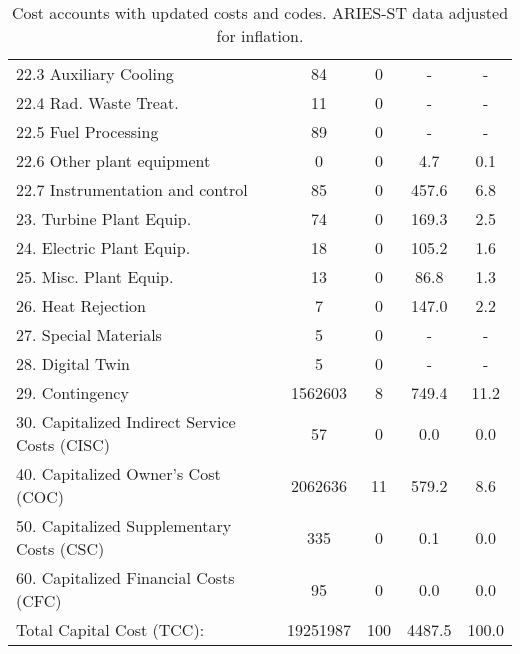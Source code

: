 \begin{table}[h!]
{\begin{tabular}{lcccc}
\hspace{10mm}22.3 Auxiliary Cooling & 84 & 0 & - & - \\
\hspace{10mm}22.4 Rad. Waste Treat. & 11 & 0 & - & - \\
\hspace{10mm}22.5 Fuel Processing & 89 & 0 & - & - \\
\hspace{10mm}22.6 Other plant equipment & 0 & 0 & 4.7 & 0.1 \\
\hspace{10mm}22.7 Instrumentation and control & 85 & 0 & 457.6 & 6.8 \\
\hspace{5mm}23. Turbine Plant Equip. & 74 & 0 & 169.3 & 2.5 \\
\hspace{5mm}24. Electric Plant Equip. & 18 & 0 & 105.2 & 1.6 \\
\hspace{5mm}25. Misc. Plant Equip. & 13 & 0 & 86.8 & 1.3 \\
\hspace{5mm}26. Heat Rejection & 7 & 0 & 147.0 & 2.2 \\
\hspace{5mm}27. Special Materials & 5 & 0 & - & - \\
\hspace{5mm}28. Digital Twin & 5 & 0 & - & - \\
\hspace{5mm}29. Contingency & 1562603 & 8 & 749.4 & 11.2 \\
30. Capitalized Indirect Service Costs (CISC) & 57 & 0 & 0.0 & 0.0 \\
40. Capitalized Owner’s Cost (COC) & 2062636 & 11 & 579.2 & 8.6 \\
50. Capitalized Supplementary Costs (CSC) & 335 & 0 & 0.1 & 0.0 \\
60. Capitalized Financial Costs (CFC) & 95 & 0 & 0.0 & 0.0 \\
\hline
Total Capital Cost (TCC): & 19251987 & 100 & 4487.5 & 100.0 \\
\hline
\end{tabular}
}
\caption{Cost accounts with updated costs and codes. ARIES-ST data adjusted for inflation.}
\label{tab:costs_updated_codes}
\end{table}


